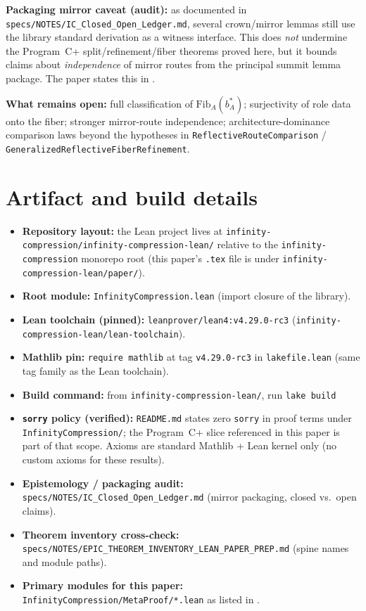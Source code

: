 \documentclass[11pt]{article}
\begin{document}
\textbf{Packaging mirror caveat (audit):} as documented in \texttt{specs/NOTES/IC\_Closed\_Open\_Ledger.md}, several crown/mirror lemmas still use the library standard derivation as a witness interface. This does \emph{not} undermine the Program~C+ split/refinement/fiber theorems proved here, but it bounds claims about \emph{independence} of mirror routes from the principal summit lemma package. The paper states this in .

\textbf{What remains open:} full classification of $\mathrm{Fib}_A(b^\ast_A)$; surjectivity of role data onto the fiber; stronger mirror-route independence; architecture-dominance comparison laws beyond the hypotheses in \texttt{ReflectiveRouteComparison} / \texttt{GeneralizedReflectiveFiberRefinement}.

\section{Artifact and build details}\label{app:artifact}
\begin{itemize}
    \item \textbf{Repository layout:} the Lean project lives at \texttt{infinity-compression/infinity-compression-lean/} relative to the \texttt{infinity-compression} monorepo root (this paper's \texttt{.tex} file is under \texttt{infinity-compression-lean/paper/}).
    \item \textbf{Root module:} \texttt{InfinityCompression.lean} (import closure of the library).
    \item \textbf{Lean toolchain (pinned):} \texttt{leanprover/lean4:v4.29.0-rc3} (\texttt{infinity-compression-lean/lean-toolchain}).
    \item \textbf{Mathlib pin:} \texttt{require mathlib} at tag \texttt{v4.29.0-rc3} in \texttt{lakefile.lean} (same tag family as the Lean toolchain).
    \item \textbf{Build command:} from \texttt{infinity-compression-lean/}, run \texttt{lake build}
    \item \textbf{\texttt{sorry} policy (verified):} \texttt{README.md} states zero \texttt{sorry} in proof terms under \texttt{InfinityCompression/}; the Program~C+ slice referenced in this paper is part of that scope. Axioms are standard Mathlib + Lean kernel only (no custom axioms for these results).
    \item \textbf{Epistemology / packaging audit:} \texttt{specs/NOTES/IC\_Closed\_Open\_Ledger.md} (mirror packaging, closed vs.\ open claims).
    \item \textbf{Theorem inventory cross-check:} \texttt{specs/NOTES/EPIC\_THEOREM\_INVENTORY\_LEAN\_PAPER\_PREP.md} (spine names and module paths).
    \item \textbf{Primary modules for this paper:} \texttt{InfinityCompression/MetaProof/*.lean} as listed in .
\end{itemize}
\end{document}
